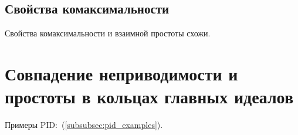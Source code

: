 \documentclass[a4paper]{report}
\begin{document}
    \subsection{Свойства комаксимальности}
    Свойства комаксимальности и взаимной простоты схожи.


    \section{Совпадение неприводимости и простоты в кольцах главных идеалов}
    Примеры PID:~(\cref{subsubsec:pid_examples}).
\end{document}
